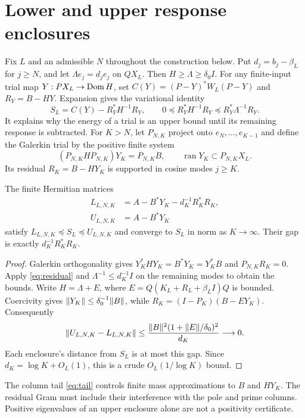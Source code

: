 \section{Lower and upper response enclosures}
Fix $L$ and an admissible $N$ throughout the construction below.
Put $d_j=b_j-\beta_L$ for $j\ge N$, and let $\Lambda e_j=d_je_j$ on
$QX_L$. Then $H\ge\Lambda\ge\delta_0I$. For any finite-input trial map
$Y:PX_L\to\operatorname{Dom} H$, set $C(Y)=(P-Y)^*W_L(P-Y)$ and $R_Y=B-HY$.
Expansion gives the variational identity
\begin{equation}\label{eq:residual}
S_L=C(Y)-R_Y^*H^{-1}R_Y,\qquad
0\preceq R_Y^*H^{-1}R_Y\preceq R_Y^*\Lambda^{-1}R_Y.
\end{equation}
It explains why the energy of a trial is an upper bound until its
remaining response is subtracted.
For $K>N$, let $P_{N,K}$ project onto $e_N,\ldots,e_{K-1}$ and define
the Galerkin trial by the positive finite system
\[
(P_{N,K}HP_{N,K})Y_K=P_{N,K}B,\qquad
\operatorname{ran}Y_K\subset P_{N,K}X_L.
\]
Its residual $R_K=B-HY_K$ is supported in cosine modes $j\ge K$.
\begin{theorem}\label{thm:enclosure}
The finite Hermitian matrices
\begin{equation}\label{eq:lower-matrix}
\begin{aligned}
L_{L,N,K}&=A-B^*Y_K-d_K^{-1}R_K^*R_K,\\
U_{L,N,K}&=A-B^*Y_K
\end{aligned}
\end{equation}
satisfy $L_{L,N,K}\preceq S_L\preceq U_{L,N,K}$ and converge to $S_L$ in norm
as $K\to\infty$. Their gap is exactly $d_K^{-1}R_K^*R_K$.
\end{theorem}
\begin{proof}
Galerkin orthogonality gives
$Y_K^*HY_K=B^*Y_K=Y_K^*B$ and $P_{N,K}R_K=0$.
Apply \eqref{eq:residual} and
$\Lambda^{-1}\le d_K^{-1}I$ on the remaining modes to obtain the bounds.
Write $H=\Lambda+E$, where $E=Q(K_L+R_L+\beta_LI)Q$ is bounded.
Coercivity gives $\lVert Y_K\rVert\le\delta_0^{-1}\lVert B\rVert$, while
$R_K=(I-P_K)(B-EY_K)$. Consequently
\[
\lVert U_{L,N,K}-L_{L,N,K}\rVert
\le\frac{\lVert B\rVert^2(1+\lVert E\rVert/\delta_0)^2}{d_K}\longrightarrow0.
\]
Each enclosure's distance from $S_L$ is at most this gap.
Since $d_K=\log K+O_L(1)$, this is a crude $O_L(1/\log K)$ bound.
\end{proof}
The column tail \eqref{eq:tail} controls finite mass approximations to $B$
and $HY_K$. The residual Gram must include their interference with the
pole and prime columns. Positive eigenvalues of an upper enclosure alone
are not a positivity certificate.

